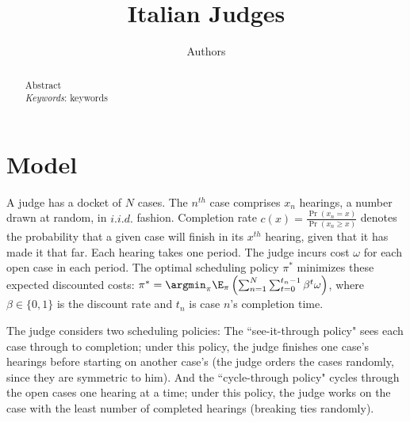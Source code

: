 



	\author{Authors}
	\doublespacing
	\title{Italian Judges}
	\maketitle

\begin{abstract}
	\noindent
	Abstract
	\\	\newline
	\noindent\emph{Keywords}: keywords
\end{abstract}


\section{Model}\label{s:intro}
	A judge has a docket of $N$ cases. The $ n^{th} $ case comprises $ x_n $ hearings, a number drawn at random, in $i.i.d.$ fashion. Completion rate $ c(x)=\frac{\Pr(x_n=x)}{\Pr(x_n\ge x)}$ denotes the probability that a given case will finish in its $x^{th}$ hearing, given that it has made it that far. Each hearing takes one period. The judge incurs cost $ \omega $ for each open case in each period. The optimal scheduling policy $ \pi^* $ minimizes these expected discounted costs: $\pi^*=\argmin_\pi \E_\pi\left (\sum_{n=1}^{N}\sum_{t=0}^{t_n-1} \beta^t\omega \right )$, where $ \beta \in \{0, 1\} $ is the discount rate and $ t_n $ is case $ n $'s  completion time.
	
	The judge considers two scheduling policies: The ``see-it-through policy" sees each case through to completion; under this policy, the judge finishes one case's hearings before starting on another case's (the judge orders the cases randomly, since they are symmetric to him). And the ``cycle-through policy" cycles through the open cases one hearing at a time; under this policy, the judge works on the case with the least number of completed hearings (breaking ties randomly).
	
